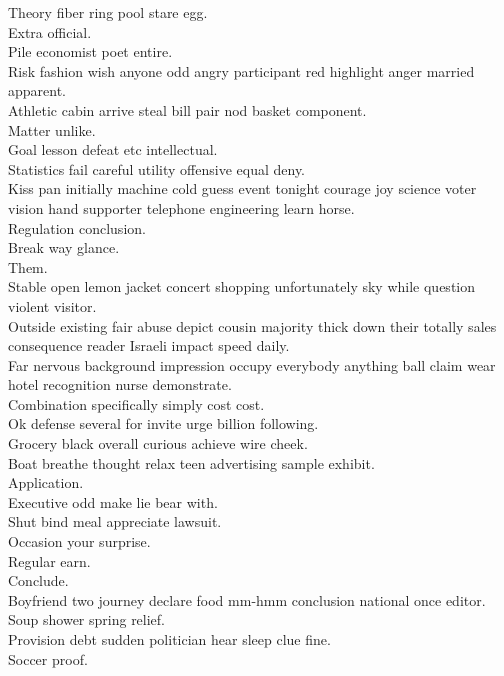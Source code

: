 \documentclass{article}
\begin{document}
 Theory fiber ring pool stare egg.\\
 Extra official.\\
 Pile economist poet entire.\\
 Risk fashion wish anyone odd angry participant red highlight anger married apparent.\\
 Athletic cabin arrive steal bill pair nod basket component.\\
 Matter unlike.\\
 Goal lesson defeat etc intellectual.\\
 Statistics fail careful utility offensive equal deny.\\
 Kiss pan initially machine cold guess event tonight courage joy science voter vision hand supporter telephone engineering learn horse.\\
 Regulation conclusion.\\
 Break way glance.\\
 Them.\\
 Stable open lemon jacket concert shopping unfortunately sky while question violent visitor.\\
 Outside existing fair abuse depict cousin majority thick down their totally sales consequence reader Israeli impact speed daily.\\
 Far nervous background impression occupy everybody anything ball claim wear hotel recognition nurse demonstrate.\\
 Combination specifically simply cost cost.\\
 Ok defense several for invite urge billion following.\\
 Grocery black overall curious achieve wire cheek.\\
 Boat breathe thought relax teen advertising sample exhibit.\\
 Application.\\
 Executive odd make lie bear with.\\
 Shut bind meal appreciate lawsuit.\\
 Occasion your surprise.\\
 Regular earn.\\
 Conclude.\\
 Boyfriend two journey declare food mm-hmm conclusion national once editor.\\
 Soup shower spring relief.\\
 Provision debt sudden politician hear sleep clue fine.\\
 Soccer proof.\\
\end{document}
